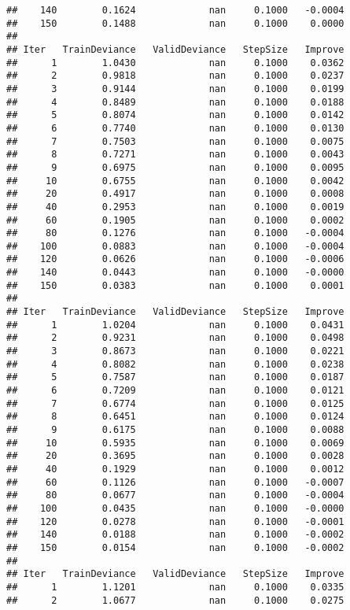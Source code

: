 \documentclass[]{article}
\begin{document}
\begin{verbatim}
##    140        0.1624             nan     0.1000   -0.0004
##    150        0.1488             nan     0.1000    0.0000
## 
## Iter   TrainDeviance   ValidDeviance   StepSize   Improve
##      1        1.0430             nan     0.1000    0.0362
##      2        0.9818             nan     0.1000    0.0237
##      3        0.9144             nan     0.1000    0.0199
##      4        0.8489             nan     0.1000    0.0188
##      5        0.8074             nan     0.1000    0.0142
##      6        0.7740             nan     0.1000    0.0130
##      7        0.7503             nan     0.1000    0.0075
##      8        0.7271             nan     0.1000    0.0043
##      9        0.6975             nan     0.1000    0.0095
##     10        0.6755             nan     0.1000    0.0042
##     20        0.4917             nan     0.1000    0.0008
##     40        0.2953             nan     0.1000    0.0019
##     60        0.1905             nan     0.1000    0.0002
##     80        0.1276             nan     0.1000   -0.0004
##    100        0.0883             nan     0.1000   -0.0004
##    120        0.0626             nan     0.1000   -0.0006
##    140        0.0443             nan     0.1000   -0.0000
##    150        0.0383             nan     0.1000    0.0001
## 
## Iter   TrainDeviance   ValidDeviance   StepSize   Improve
##      1        1.0204             nan     0.1000    0.0431
##      2        0.9231             nan     0.1000    0.0498
##      3        0.8673             nan     0.1000    0.0221
##      4        0.8082             nan     0.1000    0.0238
##      5        0.7587             nan     0.1000    0.0187
##      6        0.7209             nan     0.1000    0.0121
##      7        0.6774             nan     0.1000    0.0125
##      8        0.6451             nan     0.1000    0.0124
##      9        0.6175             nan     0.1000    0.0088
##     10        0.5935             nan     0.1000    0.0069
##     20        0.3695             nan     0.1000    0.0028
##     40        0.1929             nan     0.1000    0.0012
##     60        0.1126             nan     0.1000   -0.0007
##     80        0.0677             nan     0.1000   -0.0004
##    100        0.0435             nan     0.1000   -0.0000
##    120        0.0278             nan     0.1000   -0.0001
##    140        0.0188             nan     0.1000   -0.0002
##    150        0.0154             nan     0.1000   -0.0002
## 
## Iter   TrainDeviance   ValidDeviance   StepSize   Improve
##      1        1.1201             nan     0.1000    0.0335
##      2        1.0677             nan     0.1000    0.0275

\end{verbatim}
\end{document}
